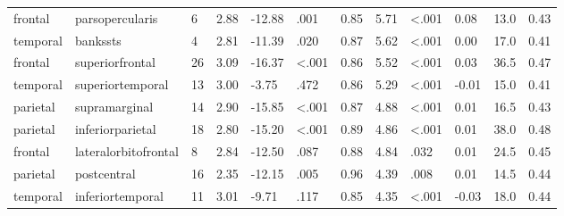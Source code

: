 \documentclass{article}
\begin{document}
\begin{longtable}{llR{1.5cm}R{1cm}R{1.3cm}R{1cm}R{1cm}R{1.3cm}R{1cm}R{1.8cm}R{1.3cm}R{1.8cm}}
   frontal &           parsopercularis &            6 &                  2.88 &           -12.88 &               .001 &                               0.85 &                          5.71 &                   \textless.001 &  0.08 &   13.0 &      0.43 \\
  temporal &                  bankssts &            4 &                  2.81 &           -11.39 &               .020 &                               0.87 &                          5.62 &                   \textless.001 &  0.00 &   17.0 &      0.41 \\
   frontal &           superiorfrontal &           26 &                  3.09 &           -16.37 &      \textless.001 &                               0.86 &                          5.52 &                   \textless.001 &  0.03 &   36.5 &      0.47 \\
  temporal &          superiortemporal &           13 &                  3.00 &            -3.75 &               .472 &                               0.86 &                          5.29 &                   \textless.001 & -0.01 &   15.0 &      0.41 \\
  parietal &             supramarginal &           14 &                  2.90 &           -15.85 &      \textless.001 &                               0.87 &                          4.88 &                   \textless.001 &  0.01 &   16.5 &      0.43 \\
  parietal &          inferiorparietal &           18 &                  2.80 &           -15.20 &      \textless.001 &                               0.89 &                          4.86 &                   \textless.001 &  0.01 &   38.0 &      0.48 \\
   frontal &      lateralorbitofrontal &            8 &                  2.84 &           -12.50 &               .087 &                               0.88 &                          4.84 &                            .032 &  0.01 &   24.5 &      0.45 \\
  parietal &               postcentral &           16 &                  2.35 &           -12.15 &               .005 &                               0.96 &                          4.39 &                            .008 &  0.01 &   14.5 &      0.44 \\
  temporal &          inferiortemporal &           11 &                  3.01 &            -9.71 &               .117 &                               0.85 &                          4.35 &                   \textless.001 & -0.03 &   18.0 &      0.44 \\

\end{longtable}
\end{document}
